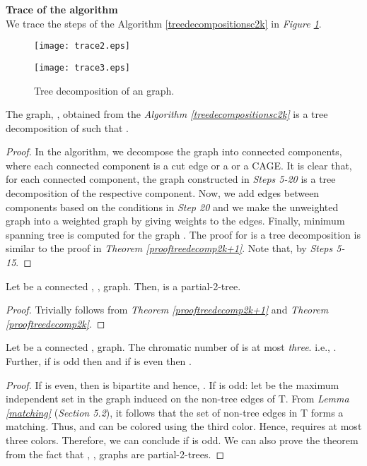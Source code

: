 \documentclass[runningheads]{llncs}
\begin{document}
\newpage

\noindent \textbf{\large{Trace of the algorithm}}\\
\noindent We trace the steps of the Algorithm \ref{treedecompositionsc2k} in \emph{Figure \ref{fig:tracetreedecompositionsc2k}}.

\begin{figure}[H]
\centering
\texttt{[image: trace2.eps]} 
\vspace{-0.2cm}
\end{figure}

\begin{figure}[h]
\centering
\texttt{[image: trace3.eps]} 
\vspace{-0.1cm}
\caption{Tree decomposition of an  graph.}
\label{fig:tracetreedecompositionsc2k}
\end{figure}

\newpage

\begin{theorem}
The graph, , obtained from the \emph{Algorithm \ref{treedecompositionsc2k}} is a tree decomposition of  such that .
\label{prooftreedecomp2k}
\end{theorem}
\begin{proof}
In the algorithm, we decompose the graph  into connected components, where each connected component is a cut edge or a  or a CAGE. It is clear that, for each connected component, the graph constructed in \emph{Steps 5-20} is a tree decomposition of the respective component. Now, we add edges between components based on the conditions in \emph{Step 20} and we make the unweighted graph into a weighted graph  by giving weights to the edges. Finally, minimum spanning tree  is computed for the graph . The proof for  is a tree decomposition is similar to the proof in \emph{Theorem \ref{prooftreedecomp2k+1}}. Note that,  by \emph{Steps 5-15}.
\end{proof}

\begin{corollary}
\label{partial}
Let  be a connected , , graph. Then,  is a partial-2-tree.
\end{corollary}
\begin{proof}
Trivially follows from \emph{Theorem \ref{prooftreedecomp2k+1}} and \emph{Theorem \ref{prooftreedecomp2k}}.
\end{proof}


\begin{theorem}
\label{coloring}
Let  be a connected , graph. The chromatic number of  is at most \emph{three}. i.e., . Further, if  is odd then  and  if  is even then .
\end{theorem}
\begin{proof}
If  is even, then  is bipartite and hence, . If  is odd: 
let  be the maximum independent set in the graph induced on the non-tree edges of T. From \emph{Lemma \ref{matching}} (\emph{Section 5.2}), it follows that the set of non-tree edges in T forms a matching. Thus,  and  can be colored using the third color. Hence,  requires at most three colors. Therefore, we can conclude  if  is odd. We can also prove the theorem from the fact that , , graphs are partial-2-trees.  
\end{proof}
\end{document}
